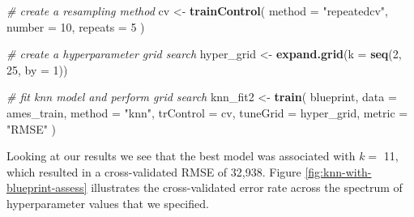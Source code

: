 \documentclass[]{krantz}
\makeatletter
\newenvironment{Shaded}{\begin{snugshade}}{\end{snugshade}}
\newcommand{\CommentTok}[1]{\textcolor[rgb]{0.37,0.37,0.37}{\textit{#1}}}
\newcommand{\DataTypeTok}[1]{\textcolor[rgb]{0.27,0.27,0.27}{#1}}
\newcommand{\DecValTok}[1]{\textcolor[rgb]{0.06,0.06,0.06}{#1}}
\newcommand{\KeywordTok}[1]{\textcolor[rgb]{0.27,0.27,0.27}{\textbf{#1}}}
\newcommand{\NormalTok}[1]{#1}
\newcommand{\StringTok}[1]{\textcolor[rgb]{0.5,0.5,0.5}{#1}}
\newenvironment{kframe}{%
\medskip{}
\setlength{\fboxsep}{.8em}
 \def\at@end@of@kframe{}%
 \ifinner\ifhmode%
  \def\at@end@of@kframe{\end{minipage}}%
  \begin{minipage}{\columnwidth}%
 \fi\fi%
 \def\FrameCommand##1{\hskip\@totalleftmargin \hskip-\fboxsep
 \colorbox{shadecolor}{##1}\hskip-\fboxsep
     \hskip-\linewidth \hskip-\@totalleftmargin \hskip\columnwidth}%
 \MakeFramed {\advance\hsize-\width
   \@totalleftmargin\z@ \linewidth\hsize
   \@setminipage}}%
 {\par\unskip\endMakeFramed%
 \at@end@of@kframe}
\renewenvironment{Shaded}{\begin{kframe}}{\end{kframe}}
\makeatother
\begin{document}
\begin{Shaded}
\begin{Highlighting}[]
\CommentTok{# create a resampling method}
\NormalTok{cv <-}\StringTok{ }\KeywordTok{trainControl}\NormalTok{(}
  \DataTypeTok{method =} \StringTok{"repeatedcv"}\NormalTok{, }
  \DataTypeTok{number =} \DecValTok{10}\NormalTok{, }
  \DataTypeTok{repeats =} \DecValTok{5}
\NormalTok{  )}

\CommentTok{# create a hyperparameter grid search}
\NormalTok{hyper_grid <-}\StringTok{ }\KeywordTok{expand.grid}\NormalTok{(}\DataTypeTok{k =} \KeywordTok{seq}\NormalTok{(}\DecValTok{2}\NormalTok{, }\DecValTok{25}\NormalTok{, }\DataTypeTok{by =} \DecValTok{1}\NormalTok{))}

\CommentTok{# fit knn model and perform grid search}
\NormalTok{knn_fit2 <-}\StringTok{ }\KeywordTok{train}\NormalTok{(}
\NormalTok{  blueprint, }
  \DataTypeTok{data =}\NormalTok{ ames_train, }
  \DataTypeTok{method =} \StringTok{"knn"}\NormalTok{, }
  \DataTypeTok{trControl =}\NormalTok{ cv, }
  \DataTypeTok{tuneGrid =}\NormalTok{ hyper_grid,}
  \DataTypeTok{metric =} \StringTok{"RMSE"}
\NormalTok{  )}
\end{Highlighting}
\end{Shaded}

Looking at our results we see that the best model was associated with \(k=\) 11, which resulted in a cross-validated RMSE of 32,938. Figure \ref{fig:knn-with-blueprint-assess} illustrates the cross-validated error rate across the spectrum of hyperparameter values that we specified.
\end{document}
